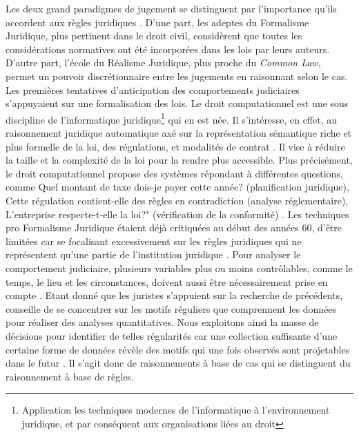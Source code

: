 Les deux grand paradigmes de jugement se distinguent par l'importance qu'ils accordent aux règles juridiques \citep{tumonis2012legalrealism}. D'une part, les adeptes du Formalisme Juridique, plus pertinent dans le droit civil, considèrent que toutes les considérations normatives ont été incorporées dans les lois par leurs auteurs. D'autre part, l'école du Réalisme Juridique, plus proche du \og \textit{Common Law}\fg{}, permet un pouvoir discrétionnaire entre les jugements en raisonnant selon le cas. Les premières tentatives d'anticipation des comportements judiciaires s'appuyaient sur une formalisation des lois. Le \og droit computationnel \fg{} est une sous discipline de  l'\og informatique juridique\footnote{Application les techniques modernes de l'informatique à l'environnement juridique, et par conséquent aux organisations liées au droit} \fg{} qui en est née. Il  s'intéresse, en effet, au raisonnement juridique automatique  axé sur la représentation sémantique riche et plus formelle de la loi, des régulations, et modalités de contrat \citep{love2005computationallaw}. Il vise à réduire la taille et la complexité de la loi pour la rendre plus accessible. Plus précisément, le \og droit computationnel \fg{} propose des systèmes répondant à différentes questions, comme \og Quel montant de taxe dois-je payer cette année? \fg{} (planification juridique), \og Cette régulation contient-elle des règles en contradiction\fg{} (analyse réglementaire),  \og L'entreprise respecte-t-elle la loi?" (vérification de la conformité) \citep{Genesereth2015computationallaw}. Les techniques pro Formalisme Juridique étaient déjà critiquées au début des années 60, d'être limitées car se focalisant excessivement sur les règles juridiques qui ne représentent qu'une partie de l'institution juridique \citep{llewellyn1962jurisprudence}. Pour analyser le comportement judiciaire, plusieurs variables plus ou moins contrôlables, comme le temps, le lieu et les circonstances, doivent aussi être nécessairement prise en compte \citep{ulmer1963quantitative}. Etant donné que les juristes s'appuient sur la recherche de précédents, \citet{ulmer1963quantitative} conseille de se concentrer sur les motifs réguliers que comprennent les données pour réaliser des analyses quantitatives. Nous exploitons ainsi la masse de décisions pour identifier de telles régularités car une collection suffisante d'une certaine forme de données révèle des motifs qui une fois observés sont projetables dans le futur \citep{ulmer1963quantitative}. Il s'agit donc de raisonnements à base de cas qui se distinguent du raisonnement à base de règles.

